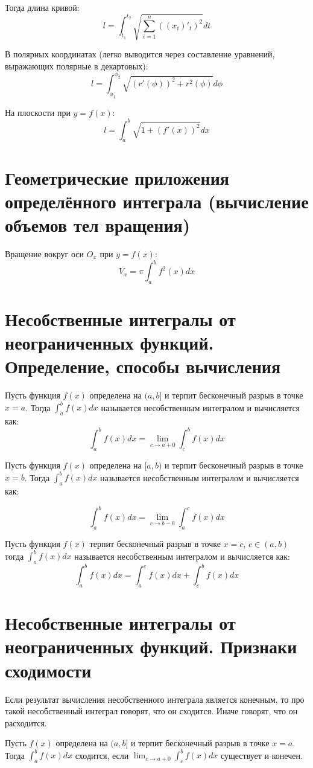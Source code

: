 \documentclass[12pt]{article}
\begin{document}
Тогда длина кривой:
\[
    l = \int_{t_1}^{t_2}\sqrt{\sum_{i=1}^n \left(\left(x_i\right)'_t\right)^2}dt
\]

В полярных координатах (легко выводится через составление уравнений, выражающих полярные в декартовых):
\[
    l = \int_{\phi_1}^{\phi_2} \sqrt{(r'(\phi))^2 + r^2(\phi)}d\phi
\]

На плоскости при $y = f(x)$:
\[
    l = \int_a^b \sqrt{1 + (f'(x))^2}dx
\]

\section{Геометрические приложения определённого интеграла (вычисление объемов тел вращения)}
Вращение вокруг оси $O_x$ при $y = f(x)$:
\[
    V_x = \pi\int_a^bf^2(x)dx
\]

\section{Несобственные интегралы от неограниченных функций. Определение, способы вычисления}
Пусть функция $f(x)$ определена на $(a, b]$ и терпит бесконечный разрыв в точке $x = a$. Тогда $\int_a^b f(x)dx$ называется несобственным интегралом и вычисляется как:
\[
    \int_a^b f(x)dx = \lim_{c \rightarrow a + 0} \int_c^b f(x)dx
\]

Пусть функция $f(x)$ определена на $[a, b)$ и терпит бесконечный разрыв в точке $x = b$. Тогда $\int_a^b f(x)dx$ называется несобственным интегралом и вычисляется как:

                \[
                    \int_a^b f(x)dx = \lim_{c \rightarrow b - 0} \int_a^c f(x)dx
                \]

                Пусть функция $f(x)$ терпит бесконечный разрыв в точке $x = c$, $c \in (a, b)$ тогда $\int_a^b f(x)dx$ называется несобственным интегралом и вычисляется как:
                \[
                    \int_a^b f(x)dx = \int_a^c f(x)dx + \int_c^b f(x)dx
                \]

                \section{Несобственные интегралы от неограниченных функций. Признаки сходимости}
                Если результат вычисления несобственного интеграла является конечным, то про такой несобственный интеграл говорят, что он сходится. Иначе говорят, что он расходится.

                Пусть $f(x)$ определена на $(a, b]$ и терпит бесконечный разрыв в точке $x = a$. Тогда $\displaystyle \int_a^b f(x)dx$ сходится, если $\displaystyle \lim_{c \rightarrow a + 0} \int_c^b f(x)dx$ существует и конечен.
\end{document}
